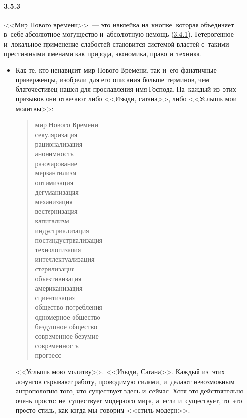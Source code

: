 \paragraph{3.5.3}\hypertarget{par:3.5.3}{} <<Мир Нового времени>>~--- это наклейка на~кнопке, которая объединяет в~себе абсолютное могущество и~абсолютную немощь (\hyperlink{par:3.4.1}{3.4.1}). Гетерогенное и~локальное применение слабостей становится системой властей с~такими престижными именами как природа, экономика, право и~техника.
	\begin{itemize}
	\item 
	Как те, кто ненавидит мир Нового Времени, так и~его фанатичные приверженцы, изобрели для его описания больше терминов, чем благочестивец нашел для прославления имя Господа. На~каждый из~этих призывов они отвечают либо <<Изыди, сатана>>, либо <<Услышь мои молитвы>>:

		\begin{verse}
		мир Нового Времени \\
		секуляризация  \\
		рационализация \\
		анонимность \\
		разочарование \\
		меркантилизм \\
		оптимизация \\
		дегуманизация \\
		механизация \\
		вестернизация \\
		капитализм \\
		индустриализация \\
		постиндустриализация \\
		технологизация \\
		интеллектуализация \\
		стерилизация \\
		объективизация \\
		американизация \\
		сциентизация \\
		общество потребления \\
		одномерное общество \\
		бездушное общество \\
		современное безумие \\
		современность \\
		прогресс
		\end{verse}

	<<Услышь мою молитву>>. <<Изыди, Сатана>>. Каждый из~этих лозунгов скрывают работу, проводимую силами, и~делают невозможным антропологию того, что существует здесь и~сейчас. Хотя это действительно очень просто: не~существует модерного мира, а~если и~существует, то~это просто стиль, как когда мы~говорим <<стиль модерн>>.
	\end{itemize}


